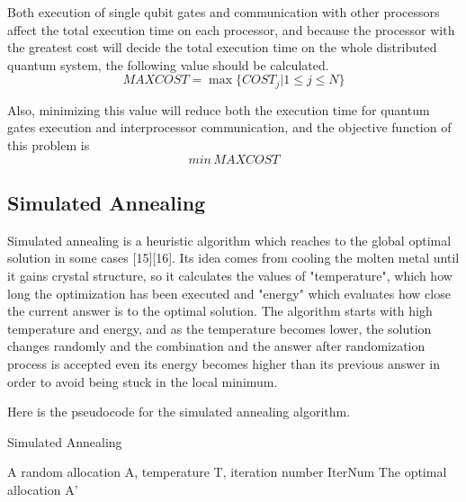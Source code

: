 Both execution of single qubit gates and communication with other processors affect the total execution time on each processor, and because the processor with the greatest cost will decide the total execution time on the whole distributed quantum system, the following value should be calculated.
$$MAXCOST = \max \{COST_j | 1 \leq j \leq N\}$$

Also, minimizing this value will reduce both the execution time for quantum gates execution and interprocessor communication, and the objective function of this problem is 
$$ min\,MAXCOST$$

\newpage
\subsection{Simulated Annealing}
Simulated annealing is a heuristic algorithm which reaches to the global optimal solution in some cases [15][16]. Its idea comes from cooling the molten metal until it gains crystal structure, so it calculates the values of "temperature", which how long the optimization has been executed and "energy" which evaluates how close the current answer is to the optimal solution.  The algorithm starts with high temperature and energy, and as the temperature becomes lower,  the solution changes randomly and the combination and the answer after randomization process is accepted even its energy becomes higher than its previous answer in order to avoid being stuck in the local minimum.

Here is the pseudocode for the simulated annealing algorithm.

\begin{algorithm}
 \caption{Simulated Annealing}
  \begin{algorithmic}[1]
  \Require A random allocation A, temperature T, iteration number IterNum
  \Ensure The optimal allocation A'
    \EndIf
 \EndFor
\EndFunction
 \end{algorithmic}
 \end{algorithm}
 

